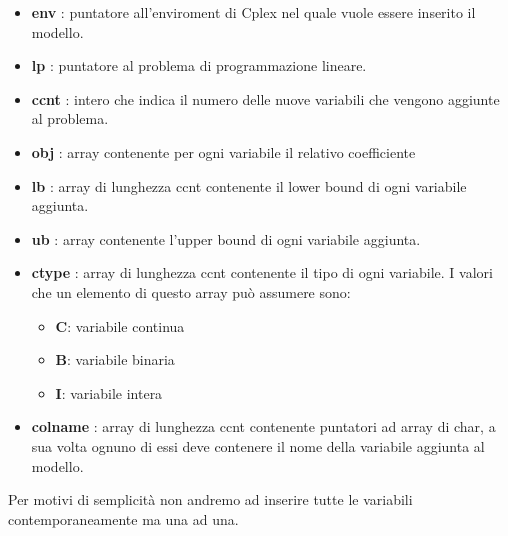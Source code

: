 \documentclass[11pt]{article}
\begin{document}
\begin{itemize}
\item \textbf{env} : puntatore all'enviroment di Cplex nel quale vuole essere inserito il modello.
\item \textbf{lp} : puntatore al problema di programmazione lineare.
\item \textbf{ccnt} : intero che indica il numero delle nuove variabili che vengono aggiunte al problema.
\item \textbf{obj} : array contenente per ogni variabile il relativo coefficiente 
\item \textbf{lb} : array di lunghezza ccnt contenente il lower bound di ogni variabile aggiunta.
\item \textbf{ub} : array contenente l'upper bound di ogni variabile aggiunta.
\item \textbf{ctype} : array di lunghezza ccnt contenente il tipo di ogni variabile. I valori che un elemento di questo array può assumere sono:
\begin{itemize}
    \item \textbf{C}: variabile continua
    \item \textbf{B}: variabile binaria
    \item \textbf{I}: variabile intera
\end{itemize}
\item \textbf{colname} : array di lunghezza ccnt contenente puntatori ad array di char, a sua volta ognuno di essi deve contenere il nome della variabile aggiunta al modello.
\end{itemize}

Per motivi di semplicità non andremo ad inserire tutte le variabili contemporaneamente ma una ad una.\\
\end{document}
